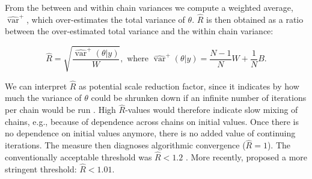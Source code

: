 \documentclass[article]{jss}
\begin{document}
From the between and within chain variances we compute a weighted average, $\widehat{\operatorname{var}}^{+}$, which over-estimates the total variance of $\theta$. $\widehat{R}$ is then obtained as a ratio between the over-estimated total variance and the within chain variance:

\begin{equation*}
\widehat{R}=\sqrt{\frac{\widehat{\operatorname{var}}^{+}(\theta | y)}{W}},
\text{ where } \widehat{\operatorname{var}}^{+}(\theta | y)=\frac{N-1}{N} W+\frac{1}{N} B.
\end{equation*}



% 

We can interpret $\widehat{R}$ as potential scale reduction factor, since it indicates by how much the variance of $\theta$ could be shrunken down if an infinite number of iterations per chain would be run \citep[$t \to \infty$;][]{gelm92}. High $\widehat{R}$-values would therefore indicate slow mixing of chains, e.g., because of dependence across chains on initial values. Once there is no dependence on initial values anymore, there is no added value of continuing iterations. The measure then diagnoses algorithmic convergence ($\widehat{R} = 1$). 
The conventionally acceptable threshold was $\widehat{R} < 1.2$ \cite{gelm92}. More recently, \cite{veht19} proposed a more stringent threshold: $\widehat{R} < 1.01$. 
\end{document}
